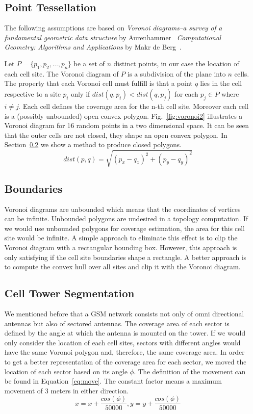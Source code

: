 \subsection{Point Tessellation}
The following assumptions are based on \emph{Voronoi diagrams--a survey of a fundamental geometric data structure} by Aurenhammer~\cite{Aurenhammer1991} \emph{Computational Geometry: Algorithms and Applications} by Makr de Berg~\cite{Berg2000}.

Let $P=\{p_1,p_2,...,p_n\}$ be a set of $n$ distinct points, in our case the location of each cell site. The Voronoi diagram of $P$ is a subdivision of the plane into $n$ cells. The property that each Voronoi cell must fulfill is that a point $q$ lies in the cell respective to a site $p_i$ only if $dist\left(q,p_i\right) < dist\left(q,p_j\right)$ for each $p_j \in P$ where $i \neq j$. Each cell defines the coverage area for the n-th cell site. Moreover each cell is a (possibly unbounded) open convex polygon. Fig.\ \ref{fig:voronoi2} illustrates a Voronoi diagram for 16 random points in a two dimensional space. It can be seen that the outer cells are not closed, they shape an open convex polygon. In Section~\ref{sec:boundaries} we show a method to produce closed polygons.
\begin{equation}
	dist(p,q)=\sqrt{\left(p_x-q_x\right)^2+\left(p_y-q_y\right)^2}
\end{equation}
\subsection{Boundaries}
\label{sec:boundaries}
Voronoi diagrams are unbounded which means that the coordinates of vertices can be infinite. Unbounded polygons are undesired in a topology computation. If we would use unbounded polygons for coverage estimation, the area for this cell site would be infinite. A simple approach to eliminate this effect is to clip the Voronoi diagram with a rectangular bounding box. However, this approach is only satisfying if the cell site boundaries shape a rectangle. A better approach is to compute the convex hull over all sites and clip it with the Voronoi diagram.

\subsection{Cell Tower Segmentation}
We mentioned before that a GSM network consists not only of omni directional antennas but also of sectored antennas. The coverage area of each sector is defined by the angle at which the antenna is mounted on the tower. If we would only consider the location of each cell sites, sectors with different angles would have the same Voronoi polygon and, therefore, the same coverage area. In order to get a better representation of the coverage area for each sector, we moved the location of each sector based on its angle $\phi$. The definition of the movement can be found in Equation~\ref{eq:move}. The constant factor means a maximum movement of 3 meters in either direction.
\begin{equation}
	\label{eq:move}
	x=x+\frac{cos(\phi)}{50000},y=y+\frac{cos(\phi)}{50000}
\end{equation}